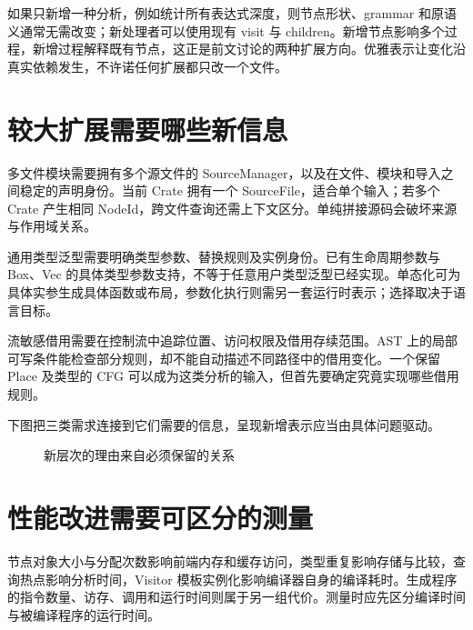 如果只新增一种分析，例如统计所有表达式深度，则节点形状、grammar 和原语义通常无需改变；新处理者可以使用现有 visit 与 children。新增节点影响多个过程，新增过程解释既有节点，这正是前文讨论的两种扩展方向。优雅表示让变化沿真实依赖发生，不许诺任何扩展都只改一个文件。

\section{较大扩展需要哪些新信息}
多文件模块需要拥有多个源文件的 SourceManager，以及在文件、模块和导入之间稳定的声明身份。当前 Crate 拥有一个 SourceFile，适合单个输入；若多个 Crate 产生相同 NodeId，跨文件查询还需上下文区分。单纯拼接源码会破坏来源与作用域关系。

通用类型泛型需要明确类型参数、替换规则及实例身份。已有生命周期参数与 Box、Vec 的具体类型参数支持，不等于任意用户类型泛型已经实现。单态化可为具体实参生成具体函数或布局，参数化执行则需另一套运行时表示；选择取决于语言目标。

流敏感借用需要在控制流中追踪位置、访问权限及借用存续范围。AST 上的局部可写条件能检查部分规则，却不能自动描述不同路径中的借用变化。一个保留 Place 及类型的 CFG 可以成为这类分析的输入，但首先要确定究竟实现哪些借用规则。

下图把三类需求连接到它们需要的信息，呈现新增表示应当由具体问题驱动。
\begin{figure}[htbp]\centering
{}
\caption{新层次的理由来自必须保留的关系}
\end{figure}

\section{性能改进需要可区分的测量}
节点对象大小与分配次数影响前端内存和缓存访问，类型重复影响存储与比较，查询热点影响分析时间，Visitor 模板实例化影响编译器自身的编译耗时。生成程序的指令数量、访存、调用和运行时间则属于另一组代价。测量时应先区分编译时间与被编译程序的运行时间。

